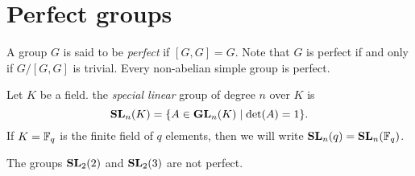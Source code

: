 \section{Perfect groups}
A group $G$ is said to be {\em perfect} if $[G,G]=G$. Note that
$G$ is perfect if and only if $G/[G,G]$ is trivial. Every non-abelian simple group is perfect.

Let $K$ be a field.  the {\em special linear} group of degree $n$ over $K$ is 
\[ \mathbf{SL}_n(K)=\{ A\in\mathbf{GL}_n(K)\mid \det(A)=1\}.\]
If $K=\mathbb{F}_q$ is the finite field of $q$ elements, then we will write $\mathbf{SL}_n(q)=\mathbf{SL}_n(\mathbb{F}_q)$.

\begin{example}
The groups $\mathbf{SL}_2(2)$ and $\mathbf{SL}_2(3)$ are not perfect. 	
\end{example}

